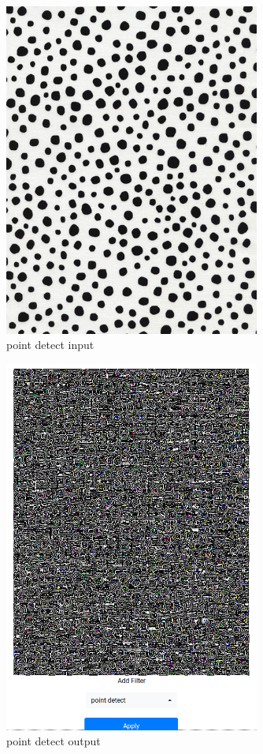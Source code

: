 \documentclass{article}
\begin{document}
  \begin{figure}[!htb]
    \centering
    \includegraphics[width=0.75\textwidth]{assets/original_points.png}
    \caption{point detect input}
    \label{fig:original-points}
  \end{figure}

  \begin{figure}[!htb]
    \centering
    \includegraphics[width=0.75\textwidth]{assets/point_detect.png}
    \caption{point detect output}
    \label{fig:point-detect-output}
  \end{figure}
\end{document}
